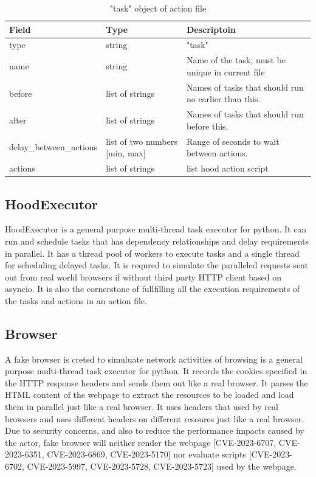 \documentclass[mscthesis]{usiinfthesis}
\begin{document}
\begin{table}[H]
  \centering
  \begin{tabular}{|p{34mm}|p{26mm}|p{65mm}|}
    \hline
    Field                   & Type                           & Descriptoin                                          \\
    \hline
    type                    & string                         & "task"                                               \\
    name                    & string                         & Name of the task, must be unique in current file     \\
    before                  & list of strings                & Names of tasks that should run no earlier than this. \\
    after                   & list of strings                & Names of tasks that should run before this.          \\
    delay\_between\_actions & list of two numbers [min, max] & Range of seconds to wait between actions.            \\
    actions                 & list of strings                & list hood action script                              \\
    \hline
  \end{tabular}
  \caption{"task" object of action file}
  \label{tab:task_object}
\end{table}

\subsection{HoodExecutor}
HoodExecutor is a general purpose multi-thread task executor for python. It can run and schedule tasks that has dependency relationships and delay requirements in parallel. It has a thread pool of workers to execute tasks and a single thread for scheduling delayed tasks. It is requred to simulate the paralleled requests sent out from real world browsers if without third party HTTP client based on asyncio. It is also the cornerstone of fullfilling all the execution requirements of the tasks and actions in an action file.

\subsection{Browser}
A fake browser is creted to simuluate network activities of browsing is a general purpose multi-thread task executor for python. It records the cookies specified in the HTTP response headers and sends them out like a real browser. It parses the HTML content of the webpage to extract the resources to be loaded and load them in parallel just like a real browser. It uses headers that used by real browsers and uses different headers on different resoures just like a real browser. Due to security concerns, and also to reduce the performance impacts caused by the actor, fake browser will neither render the webpage [CVE-2023-6707, CVE-2023-6351, CVE-2023-6869, CVE-2023-5170] nor evaluate scripts [CVE-2023-6702, CVE-2023-5997, CVE-2023-5728, CVE-2023-5723] used by the webpage.
\end{document}
